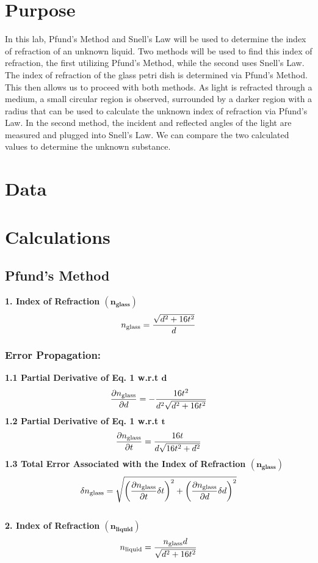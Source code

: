\documentclass[12pt]{article}
\begin{document}

\newpage
\tableofcontents
\newpage
\section{Purpose}
In this lab, Pfund's Method and Snell's Law will be used to determine the index of refraction of an unknown liquid. 
Two methods will be used to find this index of refraction, the first utilizing Pfund's Method, while the second uses Snell's Law.
The index of refraction of the glass petri dish is determined via Pfund's Method. This then allows us to proceed with both methods. 
As light is refracted through a medium, a small circular region is observed, surrounded by a darker region with a radius that can be used to calculate the unknown index of refraction via Pfund's Law.
In the second method, the incident and reflected angles of the light are measured and plugged into Snell's Law. We can compare the two calculated values to determine the unknown substance.
\newpage
\section{Data}

\newpage
\section{Calculations}
\subsection*{Pfund's Method}
\noindent \textbf{1. Index of Refraction $\bm{({n_{\textbf{glass}}})}$}\[n_{\textnormal{glass}}=\frac{\sqrt{d^2+16t^2}}{d}\]
\subsubsection*{Error Propagation:}
    \noindent\textbf{1.1 Partial Derivative of Eq. 1 w.r.t $\bm d$}\[\frac{\partial n_{\textnormal{glass}}}{\partial d}=-\dfrac{16t^2}{d^2\sqrt{d^2+16t^2}}\]
    \textbf{1.2 Partial Derivative of Eq. 1 w.r.t $\bm t$} \[\frac{\partial n_{\textnormal{glass}}}{\partial t}=\dfrac{16t}{d\sqrt{16t^2+d^2}}\]
    \textbf{1.3 Total Error Associated with the Index of Refraction $\bm{({n_{\textbf{glass}}})}$}\[\delta n_{\textnormal{glass}} =\sqrt{\left(\frac{\partial n_{\textnormal{glass}}}{\partial t}\delta t\right)^2+\left(\frac{\partial n_{\textnormal{glass}}}{\partial d}\delta d\right)^2}\]
\\\textbf{2. Index of Refraction $\bm{({n_{\textbf{liquid}}})}$}\[n_{\textnormal{liquid}}=\frac{n_{\textnormal{glass}}d}{\sqrt{d^2+16t^2}}\]
\end{document}
